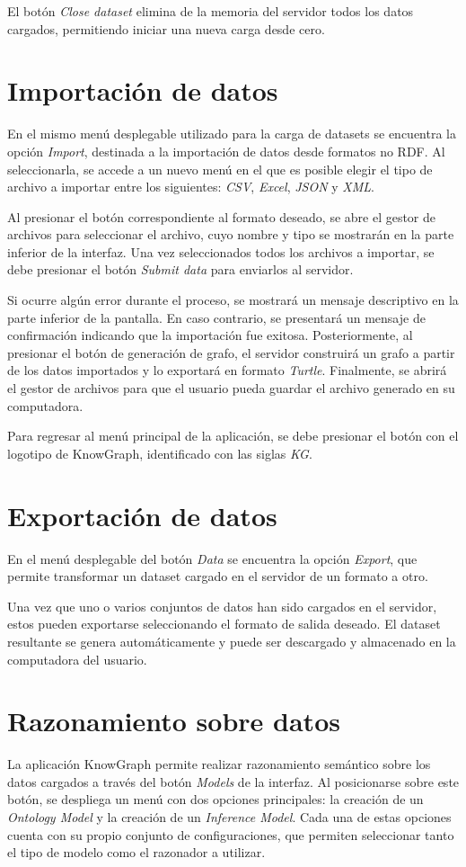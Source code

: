 \documentclass{article}
\begin{document}
El botón \textit{Close dataset} elimina de la memoria del servidor todos los datos cargados, permitiendo iniciar una nueva carga desde cero.
\section{Importación de datos}
En el mismo menú desplegable utilizado para la carga de datasets se encuentra la opción \textit{Import}, destinada a la importación de datos desde formatos no RDF. Al seleccionarla, se accede a un nuevo menú en el que es posible elegir el tipo de archivo a importar entre los siguientes: \textit{CSV}, \textit{Excel}, \textit{JSON} y \textit{XML}.

Al presionar el botón correspondiente al formato deseado, se abre el gestor de archivos para seleccionar el archivo, cuyo nombre y tipo se mostrarán en la parte inferior de la interfaz. Una vez seleccionados todos los archivos a importar, se debe presionar el botón \textit{Submit data} para enviarlos al servidor.

Si ocurre algún error durante el proceso, se mostrará un mensaje descriptivo en la parte inferior de la pantalla. En caso contrario, se presentará un mensaje de confirmación indicando que la importación fue exitosa. Posteriormente, al presionar el botón de generación de grafo, el servidor construirá un grafo a partir de los datos importados y lo exportará en formato \textit{Turtle}. Finalmente, se abrirá el gestor de archivos para que el usuario pueda guardar el archivo generado en su computadora.

Para regresar al menú principal de la aplicación, se debe presionar el botón con el logotipo de KnowGraph, identificado con las siglas \textit{KG}.

\section{Exportación de datos}
En el menú desplegable del botón \textit{Data} se encuentra la opción \textit{Export}, que permite transformar un dataset cargado en el servidor de un formato a otro.

Una vez que uno o varios conjuntos de datos han sido cargados en el servidor, estos pueden exportarse seleccionando el formato de salida deseado. El dataset resultante se genera automáticamente y puede ser descargado y almacenado en la computadora del usuario.

\section{Razonamiento sobre datos}
La aplicación KnowGraph permite realizar razonamiento semántico sobre los datos cargados a través del botón \textit{Models} de la interfaz. Al posicionarse sobre este botón, se despliega un menú con dos opciones principales: la creación de un \textit{Ontology Model} y la creación de un \textit{Inference Model}. Cada una de estas opciones cuenta con su propio conjunto de configuraciones, que permiten seleccionar tanto el tipo de modelo como el razonador a utilizar.
\end{document}
